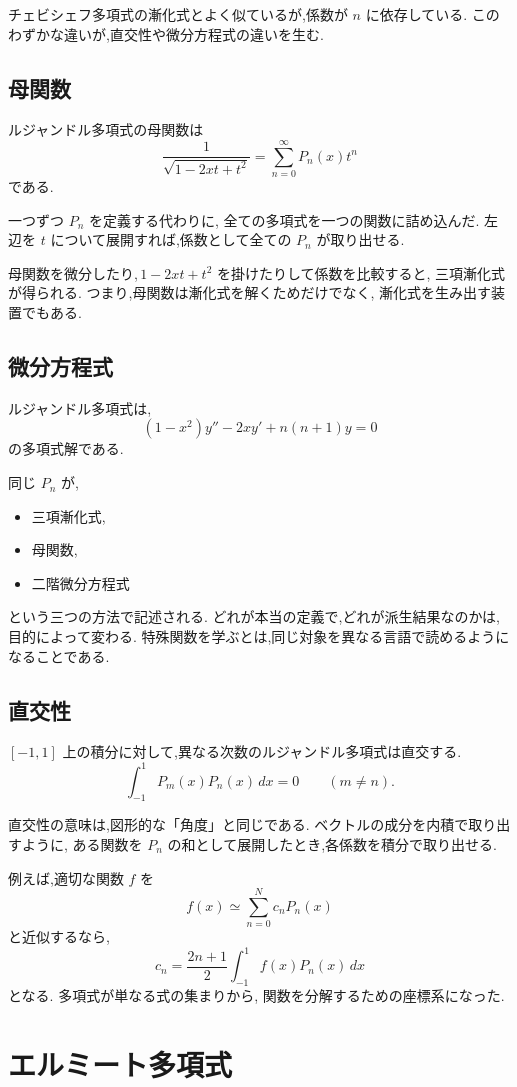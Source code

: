 チェビシェフ多項式の漸化式とよく似ているが,係数が $n$ に依存している.
このわずかな違いが,直交性や微分方程式の違いを生む.

\subsection{母関数}

ルジャンドル多項式の母関数は
\[
  \frac1{\sqrt{1-2xt+t^2}}
  =\sum_{n=0}^{\infty}P_n(x)t^n
\]
である.

一つずつ $P_n$ を定義する代わりに,
全ての多項式を一つの関数に詰め込んだ.
左辺を $t$ について展開すれば,係数として全ての $P_n$ が取り出せる.

母関数を微分したり,\,$1-2xt+t^2$ を掛けたりして係数を比較すると,
三項漸化式が得られる.
つまり,母関数は漸化式を解くためだけでなく,
漸化式を生み出す装置でもある.

\subsection{微分方程式}

ルジャンドル多項式は,
\[
  (1-x^2)y''-2xy'+n(n+1)y=0
\]
の多項式解である.

同じ $P_n$ が,
\begin{itemize}
  \item 三項漸化式,
  \item 母関数,
  \item 二階微分方程式
\end{itemize}
という三つの方法で記述される.
どれが本当の定義で,どれが派生結果なのかは,目的によって変わる.
特殊関数を学ぶとは,同じ対象を異なる言語で読めるようになることである.

\subsection{直交性}

$[-1,1]$ 上の積分に対して,異なる次数のルジャンドル多項式は直交する.
\[
  \int_{-1}^{1}P_m(x)P_n(x)\,dx=0
  \qquad(m\neq n).
\]

直交性の意味は,図形的な「角度」と同じである.
ベクトルの成分を内積で取り出すように,
ある関数を $P_n$ の和として展開したとき,各係数を積分で取り出せる.

例えば,適切な関数 $f$ を
\[
  f(x)\simeq\sum_{n=0}^{N}c_nP_n(x)
\]
と近似するなら,
\[
  c_n=
  \frac{2n+1}{2}
  \int_{-1}^{1}f(x)P_n(x)\,dx
\]
となる.
多項式が単なる式の集まりから,
関数を分解するための座標系になった.

\section{エルミート多項式}

